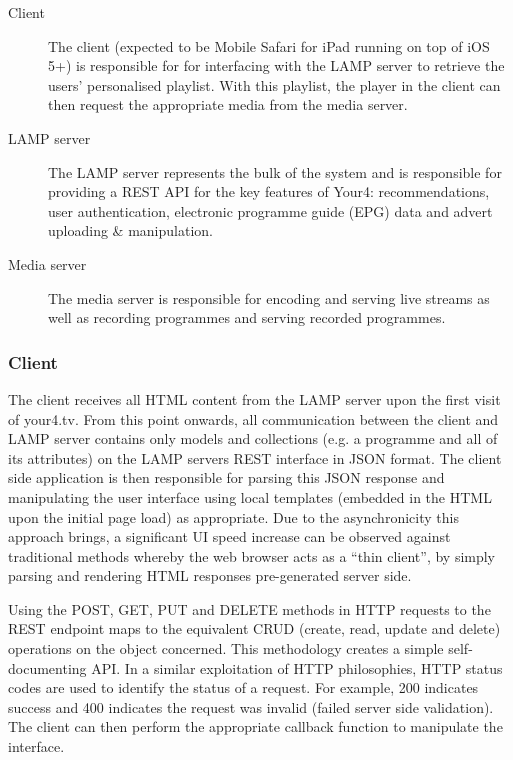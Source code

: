 \begin{description}
	\item[Client] The client (expected to be Mobile Safari for iPad running on top of iOS 5+) is responsible for for interfacing with the LAMP server to retrieve the users' personalised playlist. With this playlist, the player in the client can then request the appropriate media from the media server.
	\item[LAMP server] The LAMP server represents the bulk of the system and is responsible for providing a REST API for the key features of Your4: recommendations, user authentication, electronic programme guide (EPG) data and advert uploading \& manipulation.
	\item[Media server] The media server is responsible for encoding and serving live streams as well as recording programmes and serving recorded programmes.
\end{description}

\subsubsection{Client}

The client receives all HTML content from the LAMP server upon the first visit of your4.tv. From this point onwards, all communication between the client and LAMP server contains only models and collections (e.g. a programme and all of its attributes) on the LAMP servers REST interface in JSON format. The client side application is then responsible for parsing this JSON response and manipulating the user interface using local templates (embedded in the HTML upon the initial page load) as appropriate. Due to the asynchronicity this approach brings, a significant UI speed increase can be observed against traditional methods whereby the web browser acts as a ``thin client'', by simply parsing and rendering HTML responses pre-generated server side.

Using the POST, GET, PUT and DELETE methods in HTTP requests to the REST endpoint maps to the equivalent CRUD (create, read, update and delete) operations on the object concerned. This methodology creates a simple self-documenting API. In a similar exploitation of HTTP philosophies, HTTP status codes are used to identify the status of a request. For example, 200 indicates success and 400 indicates the request was invalid (failed server side validation). The client can then perform the appropriate callback function to manipulate the interface.

